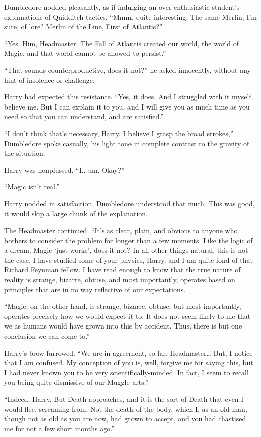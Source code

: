 Dumbledore nodded pleasantly, as if indulging an over-enthusiastic student’s explanations of Quidditch tactics. “Mmm, quite interesting. The same Merlin, I’m sure, of lore? Merlin of the Line, First of Atlantis?”

“Yes. Him, Headmaster. The Fall of Atlantis created our world, the world of Magic, and that world cannot be allowed to persist.”

“That sounds counterproductive, does it not?” he asked innocently, without any hint of insolence or challenge.

Harry had expected this resistance. “Yes, it does. And I struggled with it myself, believe me. But I can explain it to you, and I will give you as much time as you need so that you can understand, and are satisfied.”

“I don’t think that’s necessary, Harry. I believe I grasp the broad strokes,” Dumbledore spoke casually, his light tone in complete contrast to the gravity of the situation.

Harry was nonplussed. “I.. um. Okay?”

“Magic isn’t real.”

Harry nodded in satisfaction. Dumbledore understood that much. This was good, it would skip a large chunk of the explanation.

The Headmaster continued. “It’s as clear, plain, and obvious to anyone who bothers to consider the problem for longer than a few moments. Like the logic of a dream, Magic ‘just works’, does it not? In all other things natural, this is not the case. I have studied some of your physics, Harry, and I am quite fond of that Richard Feynman fellow. I have read enough to know that the true nature of reality is strange, bizarre, obtuse, and most importantly, operates based on principles that are in no way reflective of our expectations.

“Magic, on the other hand, is strange, bizarre, obtuse, but most importantly, operates precisely how we would expect it to. It does not seem likely to me that we as humans would have grown into this by accident. Thus, there is but one conclusion we can come to.”

Harry’s brow furrowed. “We are in agreement, so far, Headmaster… But, I notice that I am confused. My conception of you is, well, forgive me for saying this, but I had never known you to be very scientifically-minded. In fact, I seem to recall you being quite dismissive of our Muggle arts.”

“Indeed, Harry. But Death approaches, and it is the sort of Death that even I would flee, screaming from. Not the death of the body, which I, as an old man, though not as old as you are now, had grown to accept, and you had chastised me for not a few short months ago.”

